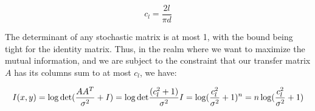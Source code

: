 \documentclass[11pt]{article}
\begin{document}
$$c_l = \frac{2l}{\pi d}$$

The determinant of any stochastic matrix is at most 1, with the bound being tight for the identity matrix. Thus, in the realm where we want to maximize the mutual information, and we are subject to the constraint that our transfer matrix $A$ has its columns sum to at most $c_l$, we have:

\begin{equation}
    I(x, y) = \log \mathrm{det}(\frac{AA^T}{\sigma^2} + I) \\
    = \log \mathrm{det}{\frac{(c_l^2 + 1)}{\sigma^2}I} \\
    = \log(\frac{c_l^2}{\sigma^2} + 1)^n \\
    = n\log(\frac{c_l^2}{\sigma^2} + 1)
\end{equation}
\end{document}

